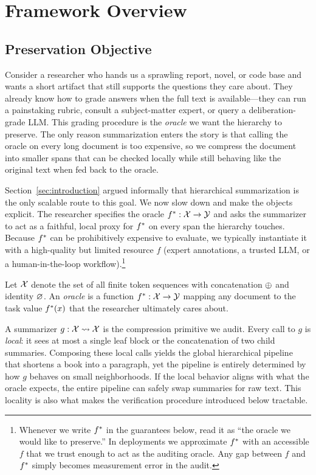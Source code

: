 \section{Framework Overview}\label{sec:framework}

\subsection{Preservation Objective}

Consider a researcher who hands us a sprawling report, novel, or code base and wants a short artifact that still supports the questions they care about. They already know how to grade answers when the full text is available---they can run a painstaking rubric, consult a subject-matter expert, or query a deliberation-grade LLM. This grading procedure is the \emph{oracle} we want the hierarchy to preserve. The only reason summarization enters the story is that calling the oracle on every long document is too expensive, so we compress the document into smaller spans that can be checked locally while still behaving like the original text when fed back to the oracle.

Section~\ref{sec:introduction} argued informally that hierarchical summarization is the only scalable route to this goal. We now slow down and make the objects explicit. The researcher specifies the oracle $f^{\ast}: \mathcal{X} \to \mathcal{Y}$ and asks the summarizer to act as a faithful, local proxy for $f^{\ast}$ on every span the hierarchy touches. Because $f^{\ast}$ can be prohibitively expensive to evaluate, we typically instantiate it with a high-quality but limited resource $f$ (expert annotations, a trusted LLM, or a human-in-the-loop workflow).\footnote{Whenever we write $f^{\ast}$ in the guarantees below, read it as ``the oracle we would like to preserve.'' In deployments we approximate $f^{\ast}$ with an accessible $f$ that we trust enough to act as the auditing oracle. Any gap between $f$ and $f^{\ast}$ simply becomes measurement error in the audit.}

\begin{definition}[Oracle]\label{def:oracle}
Let $\mathcal{X}$ denote the set of all finite token sequences with concatenation $\oplus$ and identity $\varnothing$. An \emph{oracle} is a function $f^{\ast}: \mathcal{X} \to \mathcal{Y}$ mapping any document to the task value $f^{\ast}(x)$ that the researcher ultimately cares about.
\end{definition}

A summarizer $g: \mathcal{X} \rightsquigarrow \mathcal{X}$ is the compression primitive we audit. Every call to $g$ is \emph{local}: it sees at most a single leaf block or the concatenation of two child summaries. Composing these local calls yields the global hierarchical pipeline that shortens a book into a paragraph, yet the pipeline is entirely determined by how $g$ behaves on small neighborhoods. If the local behavior aligns with what the oracle expects, the entire pipeline can safely swap summaries for raw text. This locality is also what makes the verification procedure introduced below tractable.

